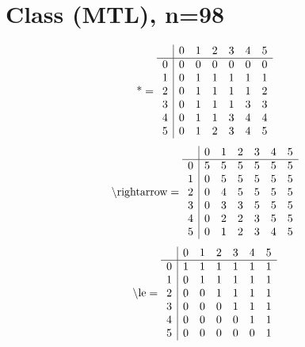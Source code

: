 \documentclass[11pt]{article}
\begin{document}
\section{Class (MTL), n=98}
\[\text{*} = 
\begin{array}{r | r r r r r r}
 & 0 & 1 & 2 & 3 & 4 & 5 \\ \hline
0 & 0 & 0 & 0 & 0 & 0 & 0 \\
1 & 0 & 1 & 1 & 1 & 1 & 1 \\
2 & 0 & 1 & 1 & 1 & 1 & 2 \\
3 & 0 & 1 & 1 & 1 & 3 & 3 \\
4 & 0 & 1 & 1 & 3 & 4 & 4 \\
5 & 0 & 1 & 2 & 3 & 4 & 5 \\
\end{array}
\]
\[\text{\textbackslash rightarrow} = 
\begin{array}{r | r r r r r r}
 & 0 & 1 & 2 & 3 & 4 & 5 \\ \hline
0 & 5 & 5 & 5 & 5 & 5 & 5 \\
1 & 0 & 5 & 5 & 5 & 5 & 5 \\
2 & 0 & 4 & 5 & 5 & 5 & 5 \\
3 & 0 & 3 & 3 & 5 & 5 & 5 \\
4 & 0 & 2 & 2 & 3 & 5 & 5 \\
5 & 0 & 1 & 2 & 3 & 4 & 5 \\
\end{array}
\]
\[\text{\textbackslash le} = 
\begin{array}{r | r r r r r r}
 & 0 & 1 & 2 & 3 & 4 & 5 \\ \hline
0 & 1 & 1 & 1 & 1 & 1 & 1 \\
1 & 0 & 1 & 1 & 1 & 1 & 1 \\
2 & 0 & 0 & 1 & 1 & 1 & 1 \\
3 & 0 & 0 & 0 & 1 & 1 & 1 \\
4 & 0 & 0 & 0 & 0 & 1 & 1 \\
5 & 0 & 0 & 0 & 0 & 0 & 1 \\
\end{array}
\]
\end{document}
